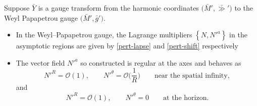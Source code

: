  \begin{Lemma}
 	Suppose $\bar{Y}$ is a gauge transform from the harmonic coordinates $\bigl(\bar{M}', \bar{\gg}'\bigr)$ to the Weyl Papapetrou gauge $\bigl(\bar{M}', \bar{g}'\bigr)$.
 	\begin{itemize}\itemsep=0pt
 \item In the Weyl--Papapetrou gauge, the Lagrange multipliers $\left\{ N, N'^a\right\}$ in the asymptotic regions are given by \eqref{pert-lapse} and \eqref{pert-shift} respectively

\item The vector field $N'^a$ so constructed is regular at the axes and behaves as
\[
N'^R = \mathcal{O}(1), \qquad N'^\theta = \mathcal{O}\biggl(\frac{1}{R}\biggr) \qquad \text{near the spatial infinity},
\]
and
\[
N'^R = \mathcal{O}(1), \qquad N'^\theta =0 \qquad \text{at the horizon}.
\]
\end{itemize}
\end{Lemma}
